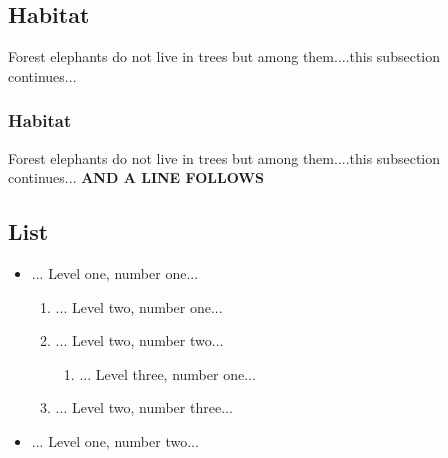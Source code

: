 \documentclass{article}
\begin{document}
\subsection{Habitat}
\par Forest elephants do not live in trees but among them....this subsection continues... 
\subsubsection{Habitat}
\par Forest elephants do not live in trees but among them....this subsection continues...  
\textbf{AND A LINE FOLLOWS}
\subsection{List}
\begin{itemize}
\item ... Level one, number one...
\begin{enumerate}
\item ... Level two, number one...
\item ... Level two, number two...
\begin{enumerate}
\item ... Level three, number one...
\end{enumerate}
\item ... Level two, number three...
\end{enumerate}
\item ... Level one, number two...
\end{itemize}
\end{document}
